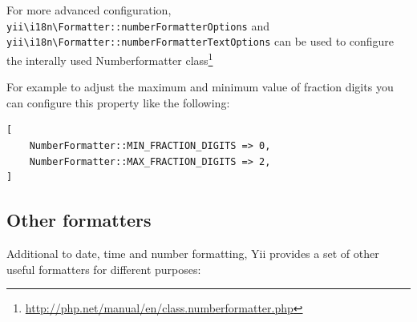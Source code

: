 For more advanced configuration, \texttt{yii{\allowbreak{}\textbackslash}i18n{\allowbreak{}\textbackslash}Formatter\allowbreak{}::\allowbreak{}numberFormatterOptions} and \texttt{yii{\allowbreak{}\textbackslash}i18n{\allowbreak{}\textbackslash}Formatter\allowbreak{}::\allowbreak{}numberFormatterTextOptions}
can be used to configure the interally used Numberformatter class\footnote{\url{http://php.net/manual/en/class.numberformatter.php}}

For example to adjust the maximum and minimum value of fraction digits you can configure this property like the following:

\lstset{language=php}\begin{lstlisting}
[
    NumberFormatter::MIN_FRACTION_DIGITS => 0,
    NumberFormatter::MAX_FRACTION_DIGITS => 2,
]
\end{lstlisting}
\subsection{Other formatters  \label{output-formatter.md::other}}
Additional to date, time and number formatting, Yii provides a set of other useful formatters for different purposes:

